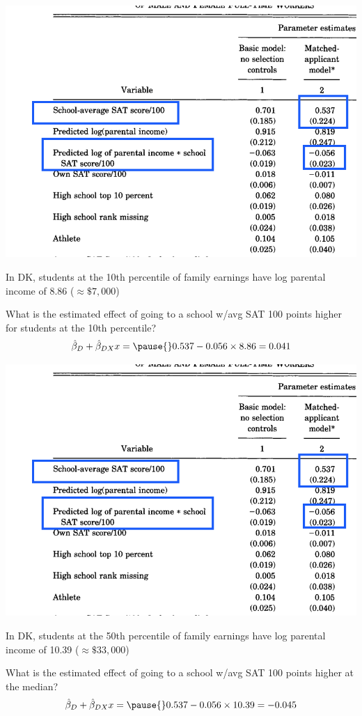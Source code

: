 \documentclass[11pt,english,handout]{beamer}
\newenvironment{wideitemize}{\itemize\addtolength{\itemsep}{10pt}}{\enditemize}
\begin{document}
\begin{frame}
\begin{center}
\includegraphics[width = 0.5\linewidth]{dk-interactions}	
\end{center}
\pause
\begin{wideitemize}
\item In DK, students at the 10th percentile of family earnings have log parental income of 8.86 ($\approx \$7,000 $)

\item What is the estimated effect of going to a school w/avg SAT 100 points higher for students at the 10th percentile? 
\pause
$$\hat\beta_D + \hat\beta_{DX} x  = \pause{} 0.537 - 0.056 \times 8.86 = 0.041$$


\end{wideitemize}
\end{frame}


\begin{frame}
	\begin{center}
		\includegraphics[width = 0.5\linewidth]{dk-interactions}	
	\end{center}
	\begin{wideitemize}
		
		\item  In DK, students at the 50th percentile of family earnings have log parental income of 10.39 ($\approx \$33,000 $)
		
		\item What is the estimated effect of going to a school w/avg SAT 100 points higher at the median? 
		$$\hat\beta_D + \hat\beta_{DX} x  = \pause{} 0.537 - 0.056 \times 10.39 = -0.045$$		
	\end{wideitemize}
\end{frame}
\end{document}

